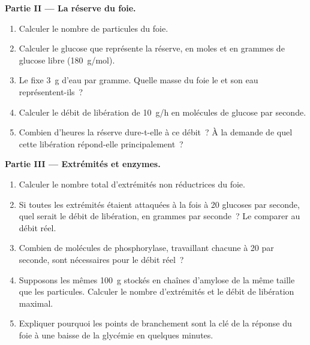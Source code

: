 \begin{problem}
\medskip
\noindent\textbf{Partie II --- La réserve du foie.}
\begin{enumerate}[resume]
  \item Calculer le nombre de particules du foie.
  \item Calculer le glucose que représente la réserve, en moles et en
        grammes de glucose libre (\qty{180}{g/mol}).
  \item Le  fixe \qty{3}{g} d'eau par gramme. Quelle masse du
        foie le  et son eau représentent-ils~?
  \item Calculer le débit de libération de \qty{10}{g/h} en molécules de
        glucose par seconde.
  \item Combien d'heures la réserve dure-t-elle à ce débit~? À la
        demande de quel  cette libération répond-elle
        principalement~?
\end{enumerate}

\medskip
\noindent\textbf{Partie III --- Extrémités et enzymes.}
\begin{enumerate}[resume]
  \item Calculer le nombre total d'extrémités non réductrices du foie.
  \item Si toutes les extrémités étaient attaquées à la fois à
        \qty{20}{} glucoses par seconde, quel serait le débit de
        libération, en grammes par seconde~? Le comparer au débit réel.
  \item Combien de molécules de phosphorylase, travaillant chacune à
        \qty{20}{} par seconde, sont nécessaires pour le débit réel~?
  \item Supposons les mêmes \qty{100}{g} stockés en chaînes d'amylose de
        la même taille que les particules. Calculer le nombre
        d'extrémités et le débit de libération maximal.
  \item Expliquer pourquoi les points de branchement sont la clé de la
        réponse du foie à une baisse de la glycémie en quelques minutes.
\end{enumerate}


\end{problem}
